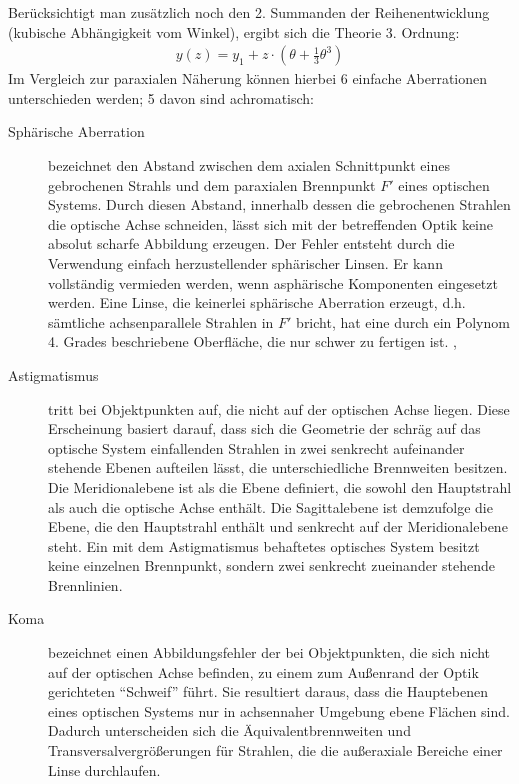 Berücksichtigt man zusätzlich noch den 2. Summanden der Reihenentwicklung (kubische Abhängigkeit vom Winkel), ergibt sich die Theorie 3. Ordnung:
\begin{align*}
y(z)=y_1 + z \cdot \left( \theta + \frac{1}{3}\theta^3\right) 
\end{align*}
Im Vergleich zur paraxialen Näherung können hierbei 6 einfache Aberrationen unterschieden werden; 5 davon sind achromatisch:
\begin{description}
	\item[Sphärische Aberration] bezeichnet den Abstand zwischen dem axialen Schnittpunkt eines gebrochenen Strahls und dem paraxialen Brennpunkt $F'$ eines optischen Systems. Durch diesen Abstand, innerhalb dessen die gebrochenen Strahlen die optische Achse schneiden, lässt sich mit der betreffenden Optik keine absolut scharfe Abbildung erzeugen. Der Fehler entsteht durch die Verwendung einfach herzustellender sphärischer Linsen. Er kann vollständig vermieden werden, wenn asphärische Komponenten eingesetzt werden. Eine Linse, die keinerlei sphärische Aberration erzeugt, d.h. sämtliche achsenparallele Strahlen in $F'$ bricht, hat eine durch ein Polynom 4. Grades beschriebene Oberfläche, die nur schwer zu fertigen ist. \cite[416ff.]{hecht2014optik}, \cite[Vol. 1, 27-2ff.]{feynman2011flp}
	\item[Astigmatismus] tritt bei Objektpunkten auf, die nicht auf der optischen Achse liegen. Diese Erscheinung basiert darauf, dass sich die Geometrie der schräg auf das optische System einfallenden Strahlen in zwei senkrecht aufeinander stehende Ebenen aufteilen lässt, die unterschiedliche Brennweiten besitzen. Die Meridionalebene ist als die Ebene definiert, die sowohl den Hauptstrahl als auch die optische Achse enthält. Die Sagittalebene ist demzufolge die Ebene, die den Hauptstrahl enthält und senkrecht auf der Meridionalebene steht. Ein mit dem Astigmatismus behaftetes optisches System besitzt keine einzelnen Brennpunkt, sondern zwei senkrecht zueinander stehende Brennlinien. \cite[428ff.]{hecht2014optik}
	\item[Koma] bezeichnet einen Abbildungsfehler der bei Objektpunkten, die sich nicht auf der optischen Achse befinden, zu einem zum Außenrand der Optik gerichteten "`Schweif"' führt. Sie resultiert daraus, dass die Hauptebenen eines optischen Systems nur in achsennaher Umgebung ebene Flächen sind. Dadurch unterscheiden sich die Äquivalentbrennweiten und Transversalvergrößerungen für Strahlen, die die außeraxiale Bereiche einer Linse durchlaufen. \cite[423ff.]{hecht2014optik}

\end{description}
